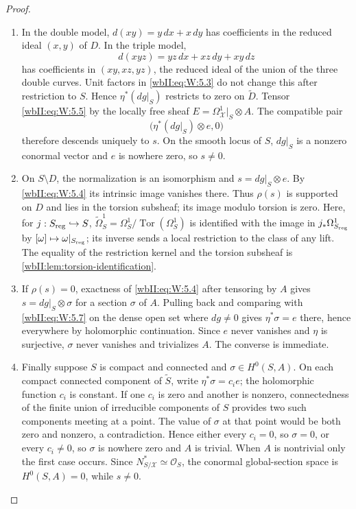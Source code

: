 \begin{proof}

\begin{enumerate}[label=\arabic*.,leftmargin=*]
\item In the double model, $d(xy)=y\,dx+x\,dy$ has coefficients in the reduced
ideal $(x,y)$ of $D$.  In the triple model,
\[
d(xyz)=yz\,dx+xz\,dy+xy\,dz
\]
has coefficients in $(xy,xz,yz)$, the reduced ideal of the union of the
three double curves.  Unit factors in \eqref{wbII:eq:W:5.3} do not change this after
restriction to $S$.  Hence $\eta^*(dg|_S)$ restricts to zero on
$\widetilde D$.  Tensor \eqref{wbII:eq:W:5.5} by the locally free sheaf
$E=\Omega^1_{\mathcal X}|_S\otimes A$.  The compatible pair
\[
\bigl(\eta^*(dg|_S)\otimes e,0\bigr)
\]
therefore descends uniquely to $s$.  On the smooth locus of $S$, $dg|_S$
is a nonzero conormal vector and $e$ is nowhere zero, so $s\ne0$.

\item On $S\setminus D$, the normalization is an isomorphism and
$s=dg|_S\otimes e$.  By \eqref{wbII:eq:W:5.4} its intrinsic image vanishes there.  Thus
$\rho(s)$ is supported on $D$ and lies in the torsion subsheaf; its image
modulo torsion is zero.  Here, for $j:S_{\rm reg}\hookrightarrow S$,
$\widetilde\Omega^1_S=\Omega^1_S/\operatorname{Tor}(\Omega^1_S)$
is identified with the image in $j_*\Omega^1_{S_{\rm reg}}$ by
$[\omega]\mapsto\omega|_{S_{\rm reg}}$; its inverse sends a local
restriction to the class of any lift.  The equality of the restriction
kernel and the torsion subsheaf is
\cref{wbII:lem:torsion-identification}.

\item If $\rho(s)=0$, exactness of \eqref{wbII:eq:W:5.4} after tensoring by $A$ gives
$s=dg|_S\otimes\sigma$ for a section $\sigma$ of $A$.  Pulling back and
comparing with \eqref{wbII:eq:W:5.7} on the dense open set where $dg\ne0$ gives
$\eta^*\sigma=e$ there, hence everywhere by holomorphic continuation.
Since $e$ never vanishes and $\eta$ is surjective, $\sigma$ never vanishes
and trivializes $A$.  The converse is immediate.

\item Finally suppose $S$ is compact and connected and $\sigma\in H^0(S,A)$.  On each compact
connected component of $\widetilde S$, write
$\eta^*\sigma=c_i e$; the holomorphic function $c_i$ is constant.  If one
$c_i$ is zero and another is nonzero, connectedness of the finite union of
irreducible components of $S$ provides two such components meeting at a
point.  The value of $\sigma$ at that point would be both zero and nonzero,
a contradiction.  Hence either every $c_i=0$, so $\sigma=0$, or every
$c_i\ne0$, so $\sigma$ is nowhere zero and $A$ is trivial.  When $A$ is
nontrivial only the first case occurs.  Since
$N^*_{S/\mathcal X}\simeq\mathcal O_S$, the conormal global-section space is
$H^0(S,A)=0$, while $s\ne0$.

\end{enumerate}
\end{proof}
